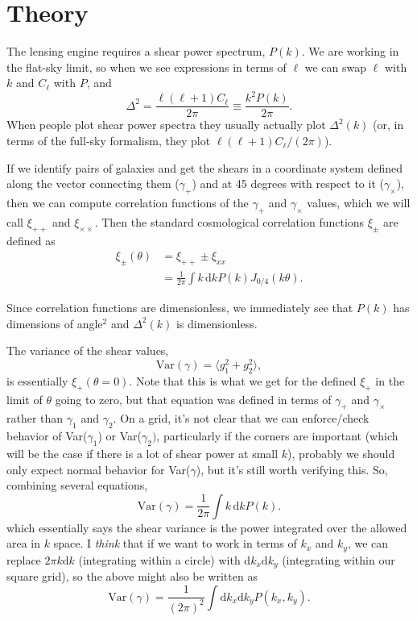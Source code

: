 \documentclass[preprint]{aastex}
\newcommand{\rmd}{\ensuremath{\mathrm{d}}}
\newcommand{\beq}{\begin{equation}}
\newcommand{\eeq}{\end{equation}}
\begin{document}
\section{Theory}

The lensing engine requires a shear power spectrum, $P(k)$.  We are
working in the flat-sky limit, so when we see expressions in terms of
$\ell$ we can swap $\ell$ with $k$ and $C_\ell$ with $P$, and
\beq
\Delta^2 = \frac{\ell(\ell+1) C_{\ell}}{2\pi}\equiv \frac{k^2 P(k)}{2\pi}.
\eeq
When people plot shear power spectra they usually actually plot
$\Delta^2(k)$ (or, in terms of the full-sky formalism, they plot $\ell(\ell+1)C_\ell/(2\pi)$).

If we identify pairs of galaxies and get the shears in a coordinate
system defined along the vector connecting them ($\gamma_+$) and at 45
degrees with respect to it ($\gamma_\times$), then we can compute
correlation functions of the $\gamma_+$ and $\gamma_\times$ values,
which we will call $\xi_{++}$ and $\xi_{\times\times}$.  Then the
standard cosmological correlation functions $\xi_{\pm}$ are defined as
\begin{align}
\xi_{\pm}(\theta) &=  \xi_{++}\pm \xi_{xx} \\
 &= \frac{1}{2\pi}\int k\,\rmd k P(k) J_{0/4}(k\theta).
\end{align}

Since correlation functions are dimensionless, we immediately see that
$P(k)$ has dimensions of angle$^2$ and $\Delta^2(k)$ is dimensionless.

The variance of the shear values, 
\beq
\mathrm{Var}(\gamma) = \langle g_1^2 + g_2^2\rangle,
\eeq
is essentially $\xi_+(\theta=0)$.   Note that this is what we get for
the defined $\xi_+$ in the limit of $\theta$ going to zero, but that
equation was defined in terms of $\gamma_+$ and $\gamma_\times$ rather
than $\gamma_1$ and $\gamma_2$.  On a grid, it's not clear that we
can enforce/check behavior of Var($\gamma_1$) or Var($\gamma_2)$,
particularly if the corners are important (which will be the case if
there is a lot of shear power at small $k$), probably we should 
 only expect normal behavior for Var($\gamma$), but it's still worth
 verifying this.  So, combining several equations,
\beq\label{E:shearvar}
\mathrm{Var}(\gamma) = \frac{1}{2\pi}\int k\,\rmd k P(k).
\eeq
which essentially says the shear variance is the power integrated over
the allowed area in $k$ space.  I {\em think} that if we want to work
in terms of $k_x$ and $k_y$, we can replace $2\pi k\rmd k$
(integrating within a circle) with $\rmd
k_x \rmd k_y$ (integrating within our square grid), so the above might also be
written as
\beq\label{E:alt-shearvar}
\mathrm{Var}(\gamma) = \frac{1}{(2\pi)^2} \int \rmd k_x \rmd k_y
P(k_x, k_y).
\eeq
\end{document}
